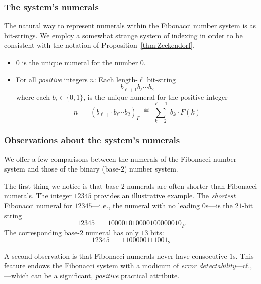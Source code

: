 
\subsubsection{The system's numerals}

The natural way to represent numerals within the Fibonacci number system is as bit-strings.  We employ a somewhat strange system of indexing in order to be consistent with the notation of Proposition~\ref{thm:Zeckendorf}.
\begin{itemize}
\item
$0$ is the unique numeral for the number $0$.
\item
For all {\em positive} integers $n$: Each length-$\ell$ bit-string
\[ b_{\ell+1} b_{\ell} \cdots b_2 \]
where each $b_i \in \{0,1\}$, is the unique numeral for the positive integer
\[ n \ = \ (b_{\ell+1} b_\ell \cdots b_2)_F \ \eqdef \  \sum_{k=2}^{\ell+1} \ b_k \cdot F(k) \]
\end{itemize}

\subsubsection{Observations about the system's numerals}

We offer a few comparisons between the numerals of the Fibonacci number system and those of the binary (base-$2$) number system.

\smallskip

The first thing we notice is that base-$2$ numerals are often shorter than Fibonacci numerals. The integer $12345$ provides an illustrative example.  The {\em shortest} Fibonacci numeral for $12345$---i.e., the numeral with no leading $0$s---is the $21$-bit string
\[ 12345 \ = \ 1 00001 01000 01000 00010_F \]
The corresponding base-$2$ numeral has only $13$ bits:
\[ 12345 \ = \ 110 00001 11001_2 \]

\medskip

A second observation is that Fibonacci numerals never have consecutive $1$s.  This feature endows the Fibonacci system with a modicum of {\em error detectability}---cf., \cite{PetersonW81}---which can be a significant, {\em positive} practical attribute.


\medskip

